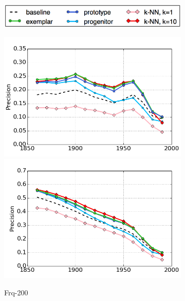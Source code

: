 \documentclass[output=paper]{langsci/langscibook}
\begin{document}
\begin{figure}[t]
\begin{subfigure}{\textwidth}
  \centering
  \includegraphics[width=.50\linewidth]{figures/GREWAL_legend.png}
\end{subfigure}
\begin{subfigure}{.32\textwidth}
  \centering
  \includegraphics[width=.98\linewidth]{figures/GREWAL_precision_frq200.png}\\
  \includegraphics[width=.98\linewidth]{figures/GREWAL_precision_frq200_future.png}
  \caption{\sc Frq-200}
\end{subfigure}
\begin{subfigure}{.32\textwidth}
  \centering

\end{subfigure}
\end{figure}
\end{document}

